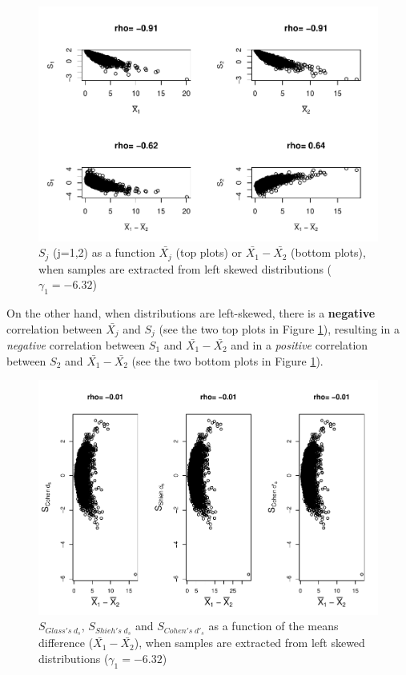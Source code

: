 \documentclass[
  man]{apa6}
\begin{document}
\begin{figure}
\centering
\includegraphics{Correlation_files/figure-latex/pltSDHombalLskew-1.pdf}
\caption{\label{fig:pltSDHombalLskew}\(S_j\) (j=1,2) as a function \(\bar{X_j}\) (top plots) or \(\bar{X_1}-\bar{X_2}\) (bottom plots), when samples are extracted from left skewed distributions (\(\gamma_1 = -6.32\))}
\end{figure}

On the other hand, when distributions are left-skewed, there is a \textbf{negative} correlation between \(\bar{X_j}\) and \(S_j\) (see the two top plots in Figure \ref{fig:pltSDHombalLskew}), resulting in a \emph{negative} correlation between \(S_1\) and \(\bar{X_1}-\bar{X_2}\) and in a \emph{positive} correlation between \(S_2\) and \(\bar{X_1}-\bar{X_2}\) (see the two bottom plots in Figure \ref{fig:pltSDHombalLskew}).

\begin{figure}
\centering
\includegraphics{Correlation_files/figure-latex/pltStdzrHombalLskew-1.pdf}
\caption{\label{fig:pltStdzrHombalLskew}\(S_{Glass's \; d_s}\), \(S_{Shieh's \; d_s}\) and \(S_{Cohen's \; d'_s}\) as a function of the means difference (\(\bar{X_1}-\bar{X_2}\)), when samples are extracted from left skewed distributions (\(\gamma_1 = -6.32\))}
\end{figure}
\end{document}
